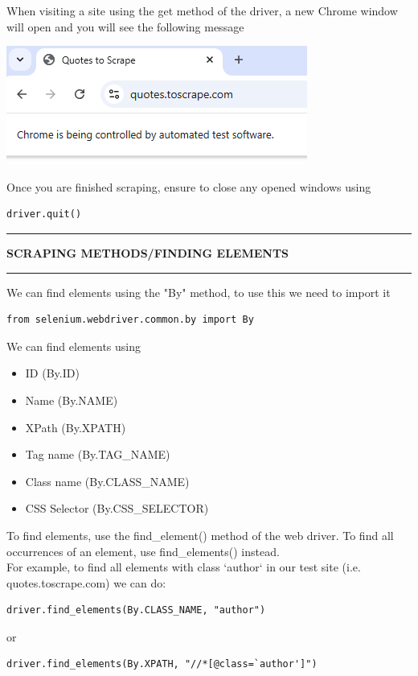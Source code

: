 \documentclass[8pt]{extarticle}
\newcommand{\heading}[1]{%
    \noindent
    \rule{\linewidth}{0.4pt}
    \begin{center}
        \vspace{-1ex}
        \textbf{#1}        
        \vspace{-2.5ex}
    \end{center}
    \rule{\linewidth}{0.4pt}
}
\begin{document}
\begin{multicols}{3}
When visiting a site using the get method of the driver, a new Chrome window will open and you will see the following message
\begin{center}
    \includegraphics[width=0.9\columnwidth]{images/automated-test-software-msg.png}
\end{center}

Once you are finished scraping, ensure to close any opened windows using 
\begin{lstlisting}[style=python]   
    driver.quit()
\end{lstlisting}

\columnbreak
\heading{SCRAPING METHODS/FINDING ELEMENTS}

We can find elements using the "By" method, to use this we need to import it

\begin{lstlisting}[style=python]   
    from selenium.webdriver.common.by import By
\end{lstlisting}

We can find elements using 
\begin{itemize}
    \item ID (By.ID)
    \item Name (By.NAME)
    \item XPath (By.XPATH)
    \item Tag name (By.TAG\_NAME)
    \item Class name (By.CLASS\_NAME)
    \item CSS Selector (By.CSS\_SELECTOR)
\end{itemize}

To find elements, use the find\_element() method of the web driver. To find all occurrences of an element, use find\_elements() instead.\\

For example, to find all elements with class `author` in our test site (i.e. quotes.toscrape.com) we can do:

\begin{lstlisting}[style=python] 
    driver.find_elements(By.CLASS_NAME, "author")
\end{lstlisting}
or
\begin{lstlisting}[style=python] 
driver.find_elements(By.XPATH, "//*[@class=`author']")
\end{lstlisting}


\end{multicols}
\end{document}
